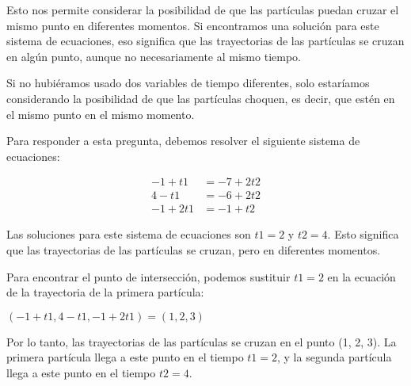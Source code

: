 \documentclass{article}
\begin{document}
\begin{enumerate}
Esto nos permite considerar la posibilidad de que las partículas puedan cruzar el mismo punto en diferentes momentos. Si encontramos una solución para este sistema de ecuaciones, eso significa que las trayectorias de las partículas se cruzan en algún punto, aunque no necesariamente al mismo tiempo. 

Si no hubiéramos usado dos variables de tiempo diferentes, solo estaríamos considerando la posibilidad de que las partículas choquen, es decir, que estén en el mismo punto en el mismo momento.

Para responder a esta pregunta, debemos resolver el siguiente sistema de ecuaciones:

\begin{align*}
-1 + t1 &= -7 + 2t2 \\
4 - t1 &= -6 + 2t2 \\
-1 + 2t1 &= -1 + t2
\end{align*}

Las soluciones para este sistema de ecuaciones son \( t1 = 2 \) y \( t2 = 4 \). Esto significa que las trayectorias de las partículas se cruzan, pero en diferentes momentos. 

Para encontrar el punto de intersección, podemos sustituir \( t1 = 2 \) en la ecuación de la trayectoria de la primera partícula:

\((-1 + t1, 4 - t1, -1 + 2t1) = (1, 2, 3)\)

Por lo tanto, las trayectorias de las partículas se cruzan en el punto (1, 2, 3). La primera partícula llega a este punto en el tiempo \( t1 = 2 \), y la segunda partícula llega a este punto en el tiempo \( t2 = 4 \).

\end{enumerate}
\end{document}
